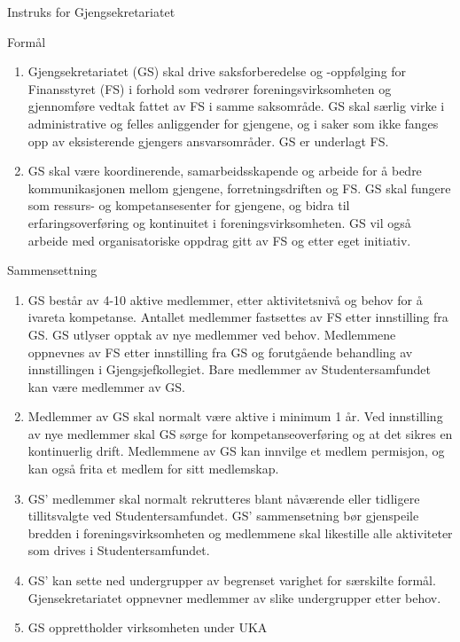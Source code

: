 
\begin{instruks}{Instruks for Gjengsekretariatet}{}{}

    \begin{instruksledd}{Formål}
        \begin{enumerate}
            \item Gjengsekretariatet (GS) skal drive saksforberedelse og -oppfølging for Finansstyret (FS) i forhold som vedrører
foreningsvirksomheten og gjennomføre vedtak fattet av FS i samme saksområde. GS
skal særlig virke i administrative og felles anliggender for gjengene, og i saker som ikke fanges opp av
eksisterende gjengers ansvarsområder. GS er underlagt FS.
            \item  GS skal være koordinerende, samarbeidsskapende og arbeide for å bedre kommunikasjonen
mellom gjengene, forretningsdriften og FS. GS skal fungere som ressurs- og
kompetansesenter for gjengene, og bidra til erfaringsoverføring og kontinuitet i foreningsvirksomheten.
GS vil også arbeide med organisatoriske oppdrag gitt av FS og etter eget initiativ.
        \end{enumerate}
    \end{instruksledd}

    \begin{instruksledd}{Sammensettning}
        \begin{enumerate}
            \item GS består av 4-10 aktive medlemmer, etter aktivitetsnivå og behov for å ivareta kompetanse.
Antallet medlemmer fastsettes av FS etter innstilling fra GS. GS
utlyser opptak av nye medlemmer ved behov. Medlemmene oppnevnes av FS etter innstilling fra
GS og forutgående behandling av innstillingen i Gjengsjefkollegiet. Bare medlemmer av
Studentersamfundet kan være medlemmer av GS.
            \item Medlemmer av GS skal normalt være aktive i minimum 1 år. Ved innstilling av nye
medlemmer skal GS sørge for kompetanseoverføring og at det sikres en kontinuerlig drift.
Medlemmene av GS kan innvilge et medlem permisjon, og kan også frita et medlem for sitt
medlemskap.
            \item  GS' medlemmer skal normalt rekrutteres blant nåværende eller tidligere tillitsvalgte ved
Studentersamfundet. GS' sammensetning bør gjenspeile bredden i foreningsvirksomheten og
medlemmene skal likestille alle aktiviteter som drives i Studentersamfundet.
            \item GS' kan sette ned undergrupper av begrenset varighet for særskilte formål. Gjensekretariatet
oppnevner medlemmer av slike undergrupper etter behov.
            \item GS opprettholder virksomheten under UKA
        \end{enumerate}
    \end{instruksledd}


\end{instruks}
